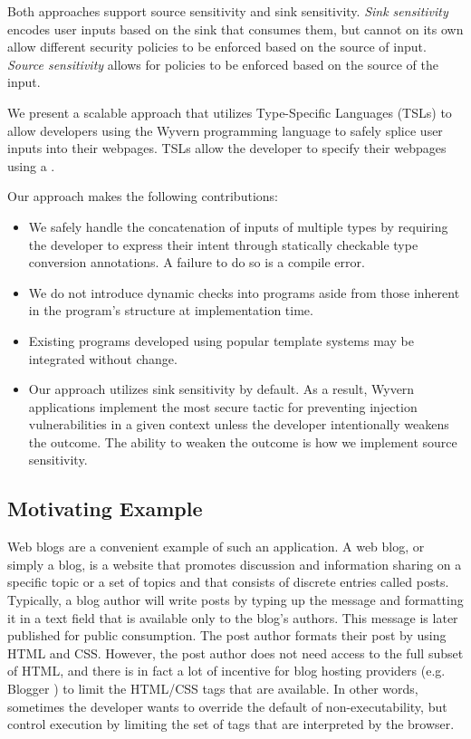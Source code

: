 Both approaches support source sensitivity and sink sensitivity. \emph{Sink sensitivity} encodes user inputs based on the sink that consumes them, but cannot on its own allow different security policies to be enforced based on the source of input. \emph{Source sensitivity} allows for policies to be enforced based on the source of the input. 

We present a scalable approach that utilizes Type-Specific Languages (TSLs)  to allow developers using the Wyvern programming language 
to safely splice user inputs into their webpages. TSLs allow the developer to
specify their webpages using a .

Our approach makes the following contributions:

\begin{itemize}
\item We safely handle the concatenation of inputs of multiple types by requiring the developer to express their intent through statically checkable type conversion annotations. A failure to do so is a compile error.
\item We do not introduce dynamic checks into programs aside from those inherent in the program's structure at implementation time.
\item Existing programs developed using popular template systems may be integrated without change.
\item Our approach utilizes sink sensitivity by default. As a result, Wyvern applications implement the most secure tactic for preventing injection vulnerabilities in a given context unless the developer intentionally weakens the outcome. The ability to weaken the outcome is how we implement source sensitivity.
\end{itemize}
\subsection{Motivating Example}


Web blogs are a convenient
example of such an application. A web blog, or simply a blog, is a
website that promotes discussion and information sharing on a specific
topic or a set of topics and that consists of discrete entries called posts.
Typically, a blog author will write posts by typing up the message
and formatting it in a text field that is available only to the blog's
authors. This message is later published for public consumption. The
post author formats their post by using HTML and CSS. However, the
post author does not need access to the full subset of HTML, and there
is in fact a lot of incentive for blog hosting providers (e.g. Blogger
\cite{blogger}) to limit the HTML/CSS tags that are available. In other words, sometimes the developer wants to override the default of non-executability, but control execution by limiting the set of tags that are interpreted by the browser.

